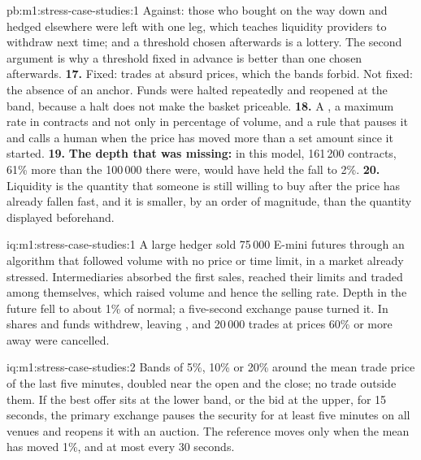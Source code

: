 \begin{solution}{pb:m1:stress-case-studies:1}
Against: those who bought on the way down and hedged elsewhere were left with
one leg, which teaches liquidity providers to withdraw next time; and a
threshold chosen afterwards is a lottery. The second argument is why a
threshold fixed in advance is better than one chosen afterwards.
\textbf{17.} Fixed: trades at absurd prices, which the bands forbid. Not fixed:
the absence of an anchor. Funds were halted repeatedly and reopened at the
band, because a halt does not make the basket priceable.
\textbf{18.} A , a maximum rate in contracts and not only in percentage
of volume, and a rule that pauses it and calls a human when the price has
moved more than a set amount since it started.
\textbf{19.} \textbf{The depth that was missing:} in this model, 161\,200 contracts, 61\%
more than the 100\,000 there were, would have held the fall to 2\%.
\textbf{20.} Liquidity is the quantity that someone is still willing to buy after
the price has already fallen fast, and it is smaller, by an order of
magnitude, than the quantity displayed beforehand.
\end{solution}

\begin{solution}{iq:m1:stress-case-studies:1}
A large hedger sold 75\,000 E-mini futures through an algorithm that followed
volume with no price or time limit, in a market already stressed.
Intermediaries absorbed the first sales, reached their limits and traded
among themselves, which raised volume and hence the selling rate. Depth in
the future fell to about 1\% of normal; a five-second exchange pause turned
it. In shares and funds  withdrew, leaving , and
20\,000 trades at prices 60\% or more away were cancelled.
\end{solution}

\begin{solution}{iq:m1:stress-case-studies:2}
Bands of 5\%, 10\% or 20\% around the mean trade price of the last five
minutes, doubled near the open and the close; no trade outside them. If the
best offer sits at the lower band, or the bid at the upper, for 15 seconds,
the primary exchange pauses the security for at least five minutes on all
venues and reopens it with an auction. The reference moves only when the
mean has moved 1\%, and at most every 30 seconds.
\end{solution}

